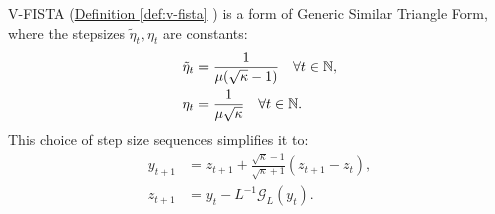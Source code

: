 \documentclass[12pt]{article}
\begin{document}
        \begin{proposition}
            V-FISTA 
            (\hyperref[def:v-fista]{Definition \ref*{def:v-fista}}
            ) is a form of Generic Similar Triangle Form, where the stepsizes $\tilde \eta_t, \eta_t$ are constants: 
            \begin{align*}
                \tilde \eta_t 
                &= \frac{1}{\mu(\sqrt{\kappa} - 1)}
                \quad \forall t \in \mathbb N, 
                \\
                \eta_t
                &= 
                \frac{1}{\mu\sqrt{\kappa}}
                \quad \forall t \in \mathbb N. 
            \end{align*}
            This choice of step size sequences simplifies it to:
            \begin{align*}
                y_{t + 1} &= z_{t + 1} + 
                \frac{\sqrt{\kappa} - 1}{\sqrt{\kappa} + 1}
                (z_{t +1} - z_t), 
                \\
                z_{t + 1} 
                &= y_t - L^{-1}\mathcal G_L(y_t). 
            \end{align*}
        \end{proposition}
\end{document}
